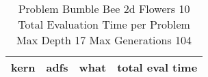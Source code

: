 \begin{table}[H]
\caption{Problem  Bumble Bee 2d  Flowers 10\\Total Evaluation Time per Problem \\ Max Depth 17 Max Generations 104\\}
\begin{center}
\scalebox{1.0} %
{
\begin{tabular}{lllr}
\hline
kern & adfs & what & total eval time \\
\hline


\end{tabular}
}
\end{center}
\end{table}

